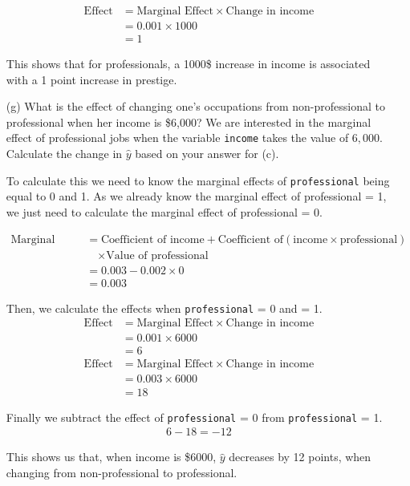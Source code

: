 \documentclass[12pt,letterpaper]{article}
\begin{document}
\begin{enumerate}
		\begin{align*}
		\text{Effect} &= 	\text{Marginal Effect} \times \text{Change in income}\\
		&= 0.001 \times 1000 \\
		&= 1
		\end{align*}
		
		This shows that for professionals, a 1000\$ increase in income is associated with a 1 point increase in prestige.
			 
	\item [(g)]
	What is the effect of changing one's occupations from non-professional to professional when her income is \$6,000? We are interested in the marginal effect of professional jobs when the variable \texttt{income} takes the value of $6,000$. Calculate the change in $\hat{y}$ based on your answer for (c).
	
	To calculate this we need to know the marginal effects of \texttt{professional} being equal to 0 and 1. As we already know the marginal effect of professional = 1, we just need to calculate the marginal effect of professional = 0.
	
		\begin{align*}
			\text{Marginal Effect} &= 	\text{Coefficient of income} + \text{Coefficient of} (\text{income} \times \text{professional})\\
			&\quad \times \text{Value of professional}\\
			&= 0.003 - 0.002 \times 0 \\
			&= 0.003
		\end{align*}
		
	Then, we calculate the effects when \texttt{professional} = 0 and = 1.
		\begin{align*}
		\text{Effect} &= 		\text{Marginal Effect} \times \text{Change in income}\\
		&= 0.001 \times 6000 \\
		&= 6
		\end{align*}
		\begin{align*}
		\text{Effect} &= 	
		\text{Marginal Effect} \times 	\text{Change in income}\\
		&= 0.003 \times 6000 \\
		&= 18
		\end{align*}
		
	Finally we subtract the effect of \texttt{professional} = 0 from \texttt{professional} = 1.
	\begin{align*}
	6 - 18 = -12
	\end{align*}
	
	This shows us that, when income is \$6000, $\hat{y}$ decreases by 12 points, when changing from non-professional to professional.
	
\end{enumerate}
\end{document}
